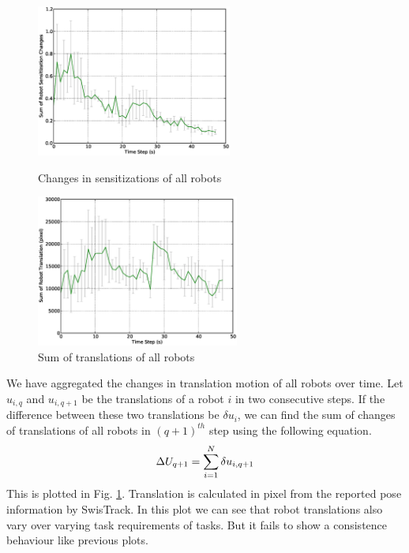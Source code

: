 \documentclass{llncs}
\begin{document}
\begin{figure}
\begin{minipage}[t]{0.5\linewidth}
\centering
\includegraphics[height=5cm, angle=0]
{images/global/RobotSensitizationStat-Total-50steps.eps}
\caption{\small Changes in sensitizations of all robots}
\label{fig:sensitization-stat} %
\end{minipage}
\hspace{0.5cm}
\begin{minipage}[t]{0.5\linewidth}
\centering
\includegraphics[height=5cm, angle=0]{images/global/DeltaTranslationStat.eps}
\caption{\small Sum of translations of all robots }
\label{fig:translation-stat} %
\end{minipage}
\end{figure}
We have aggregated the changes in translation motion of all robots over time. Let $u_{i,q}$ and $u_{i,q+1}$ be the translations of a robot $i$ in two consecutive steps. If the difference between these two translations be $\delta u_{i}$, we can find the sum of changes of translations of all robots in $(q+1)^{th}$ step using the following equation.
\begin{equation}
\small 
\Delta U_{q+1} = \sum_{i=1}^{N} \delta u_{i, q+1} 
\label{eqn:Delta-Tr}
\end{equation}
This is plotted in Fig. \ref{fig:translation-stat}. Translation is calculated in pixel from the reported pose information by SwisTrack. In this plot we can see that robot translations also vary over varying task requirements of tasks. But it fails to show a consistence behaviour like previous plots.\\
\end{document}
